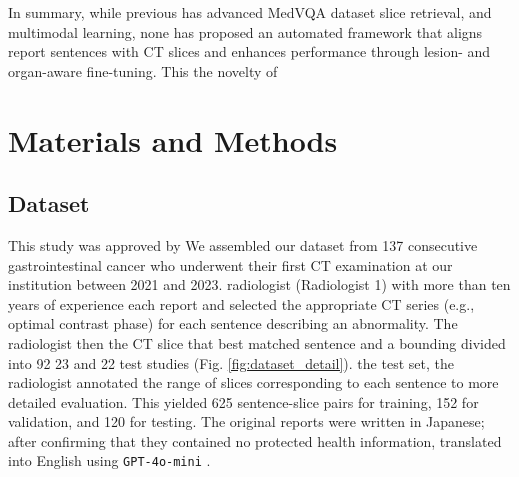 \documentclass[bioengineering,article,submit,pdftex,moreauthors]{Definitions/mdpi}
\begin{document}
In summary, while previous  has advanced MedVQA dataset  slice retrieval, and multimodal learning, none has proposed an automated framework that aligns report sentences with CT slices and enhances performance through lesion- and organ-aware fine-tuning. This  the novelty of  


\section{Materials and Methods}

\subsection{Dataset}\label{sec:dataset}
This study was approved by        
We assembled our dataset from 137 consecutive gastrointestinal cancer who underwent their ﬁrst CT examination at our institution between 2021 and 2023. 
  radiologist (Radiologist 1) with more than ten years of experience  each report and selected the appropriate CT series (e.g., optimal contrast phase) for each sentence describing an abnormality. 
The radiologist then  the CT slice that best matched  sentence and  a bounding    divided into 92  23  and 22 test studies (Fig. \ref{fig:dataset_detail}). 
 the test set, the radiologist annotated the range of slices corresponding to each sentence to  more detailed evaluation. 
This yielded 625 sentence-slice pairs for training, 152 for validation, and 120 for testing. 
The original reports were written in Japanese; after confirming that they contained no protected health information,  translated into English using \texttt{GPT-4o-mini} \cite{openai_gpt-4_2024}. 
\end{document}
